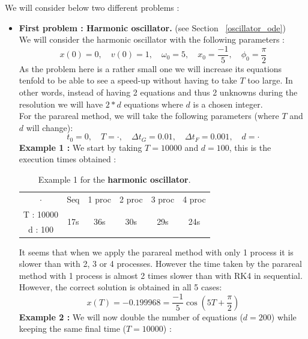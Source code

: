 \begin{enumerate}[label=\textbullet]
	We will consider below two different problems :
	\begin{itemize}[label=-]
		\item \textbf{First problem : Harmonic oscillator.} (see Section ~\ref{oscillator_ode}) \\
		We will consider the harmonic oscillator with the following parameters :
		$$x(0) = 0, \quad v(0) = 1, \quad \omega_0 = 5, \quad x_0 = \frac{-1}{5}, \quad \phi_0 = \frac{\pi}{2}$$
		As the problem here is a rather small one we will increase its equations tenfold to be able to see a speed-up without having to take $T$ too large. In other words, instead of having 2 equations and thus 2 unknowns during the resolution we will have $2*d$ equations where $d$ is a chosen integer. \\
		For the parareal method, we will take the following parameters (where $T$ and $d$ will change):
		$$t_0=0, \quad T=\cdot, \quad \Delta t_G=0.01, \quad \Delta t_F=0.001, \quad d=\cdot$$
		\textbf{Example 1 :} We start by taking $T=10000$ and $d=100$, this is the execution times obtained :
		\renewcommand{\arraystretch}{1.2}
		\begin{table}[H]
			\centering
			\begin{tabular}{| c || c | c | c | c | c |}
				\hline
				\multirow{2}{1.5 cm}{$\cdot$} & \multirow{2}{1.5 cm}{Seq} & \multirow{2}{1.5 cm}{1 proc} & \multirow{2}{1.5 cm}{2 proc} & \multirow{2}{1.5 cm}{3 proc} &\multirow{2}{1.5 cm}{4 proc} \\
				& & & & & \\
				\hline 
				T : 10000 & \multirow{2}{1.5 cm}{17s} & \multirow{2}{1.5 cm}{36s} & \multirow{2}{1.5 cm}{30s} & \multirow{2}{1.5 cm}{29s} & \multirow{2}{1.5 cm}{24s} \\
				d : 100 & & & & & \\
				\hline 
			\end{tabular}
			\caption{Example 1 for the \textbf{harmonic oscillator}.}
			\label{time_osc_1}
		\end{table}
		It seems that when we apply the parareal method with only 1 process it is slower than with 2, 3 or 4 processes. However the time taken by the parareal method with 1 process is almost 2 times slower than with RK4 in sequential. However, the correct solution is obtained in all 5 cases:
		$$x(T)=-0.199968=\frac{-1}{5}\cos\left(5T+\frac{\pi}{2}\right)$$
		\textbf{Example 2 :} We will now double the number of equations ($d=200$) while keeping the same final time ($T=10000$) :
		\begin{table}[H]

\end{table}
\end{itemize}
\end{enumerate}

